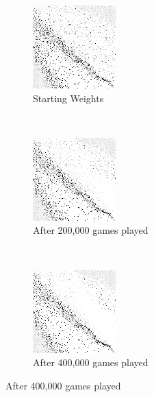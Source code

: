 
\begin{figure}
\center

	\begin{subfigure}[t]{0.2\textwidth}
	\includegraphics[width=\stratgraphwidth]{images/findings/round2/flipbook/winner/checkpoint_000000.png}
	\caption{Starting Weights}
	\end{subfigure}
	~
	\begin{subfigure}[t]{0.2\textwidth}
	\includegraphics[width=\stratgraphwidth]{images/findings/round2/flipbook/winner/checkpoint_200000.png}
	\caption{After 200,000 games played}
	\end{subfigure}
	~
	\begin{subfigure}[t]{0.2\textwidth}
	\includegraphics[width=\stratgraphwidth]{images/findings/round2/flipbook/winner/checkpoint_400000.png}
	\caption{After 400,000 games played}
	\end{subfigure}


\end{figure}
